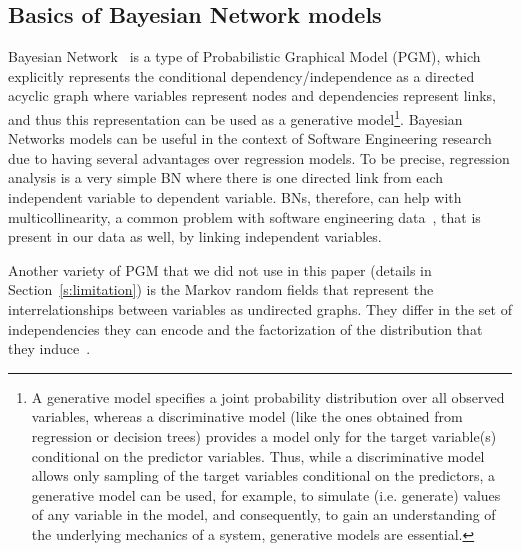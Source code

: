\documentclass[smallextended]{svjour3}       %
\begin{document}
\subsection{Basics of Bayesian Network models}
Bayesian Network~\cite{koller2009probabilistic,scutari2010introduction} 
is a type of Probabilistic Graphical Model (PGM), which explicitly represents the
conditional dependency/independence as a directed acyclic graph where variables
represent nodes and dependencies represent links, and thus this
representation can be used as a generative model\footnote{A
  generative model specifies a joint probability distribution over
  all observed variables, whereas a discriminative model
  (like the ones obtained from regression or decision trees) provides a
  model only for the target variable(s) conditional on the predictor
  variables. Thus, while a discriminative model allows only sampling
  of the target variables conditional on the predictors, a
  generative model can be used, for example, to simulate
  (i.e. generate) values of any variable in the model, and
  consequently, to gain an understanding of the underlying mechanics
  of a system, generative models are essential.}.  
Bayesian Networks models can be useful in the context of Software Engineering research~\cite{fenton1999critique} due to having several advantages over
regression models. To be precise, regression analysis is a very
simple BN where there is one directed link from each independent variable
to dependent variable. BNs, therefore, can help with 
multicollinearity, a common problem with software engineering 
data~\cite{yu2002predicting,subramanyam2003empirical,briand2000exploring,Changes07}, 
that is present in our data as well, by linking independent variables. 

Another variety of PGM that we did not use in this paper 
(details in Section~\ref{s:limitation}) is the Markov random
fields that represent the interrelationships between variables 
as undirected graphs. They differ in the set of
independencies they can encode and the factorization of the
distribution that they induce~\cite{koller2009probabilistic}.
\end{document}
